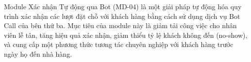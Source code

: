 Module Xác nhận Tự động qua Bot (MD-04) là một giải pháp tự động hóa quy trình xác nhận các lượt đặt chỗ với khách hàng bằng cách sử dụng dịch vụ Bot Call của bên thứ ba. Mục tiêu của module này là giảm tải công việc cho nhân viên lễ tân, tăng hiệu quả xác nhận, giảm thiểu tỷ lệ khách không đến (no-show), và cung cấp một phương thức tương tác chuyên nghiệp với khách hàng trước ngày họ đến nhà hàng.


